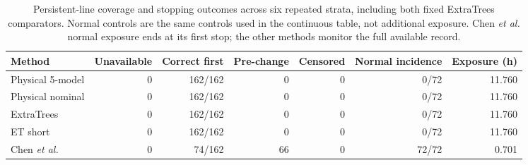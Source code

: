 \begin{table}[t]\centering\small
\caption{Persistent-line coverage and stopping outcomes across six repeated strata, including both fixed ExtraTrees comparators. Normal controls are the same controls used in the continuous table, not additional exposure. Chen \emph{et al.} normal exposure ends at its first stop; the other methods monitor the full available record.}
\label{tab:c01_persistent_coverage}
\begin{tabular}{lrrrrrr}\toprule
Method & Unavailable & Correct first & Pre-change & Censored & Normal incidence & Exposure (h)\\\midrule
Physical 5-model & 0 & 162/162 & 0 & 0 & 0/72 & 11.760\\
Physical nominal & 0 & 162/162 & 0 & 0 & 0/72 & 11.760\\
ExtraTrees & 0 & 162/162 & 0 & 0 & 0/72 & 11.760\\
ET short & 0 & 162/162 & 0 & 0 & 0/72 & 11.760\\
Chen \emph{et al.} & 0 & 74/162 & 66 & 0 & 72/72 & 0.701\\
\bottomrule\end{tabular}\end{table}

